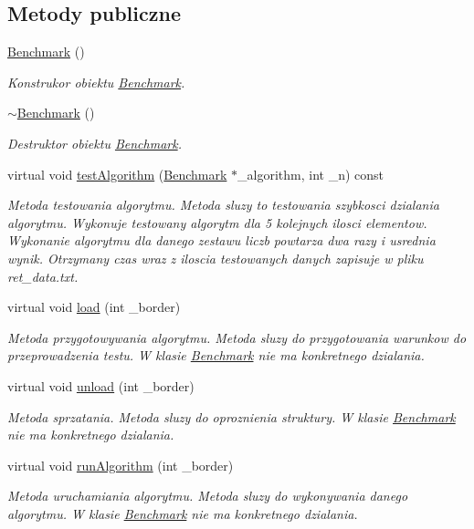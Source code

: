 \subsection*{Metody publiczne}
\begin{DoxyCompactItemize}
\item 
\hyperlink{class_benchmark_acfca497989836a688d44477802e822d8}{Benchmark} ()
\begin{DoxyCompactList}\small\item\em Konstrukor obiektu \hyperlink{class_benchmark}{Benchmark}. \end{DoxyCompactList}\item 
\hyperlink{class_benchmark_a20476e07f09e2b20ed3e9a7f13a570e6}{$\sim$\-Benchmark} ()
\begin{DoxyCompactList}\small\item\em Destruktor obiektu \hyperlink{class_benchmark}{Benchmark}. \end{DoxyCompactList}\item 
virtual void \hyperlink{class_benchmark_a900bc0d26c2ed6aa45afe4d5b295ccd1}{test\-Algorithm} (\hyperlink{class_benchmark}{Benchmark} $\ast$\-\_\-algorithm, int \-\_\-n) const 
\begin{DoxyCompactList}\small\item\em Metoda testowania algorytmu. Metoda sluzy to testowania szybkosci dzialania algorytmu. Wykonuje testowany algorytm dla 5 kolejnych ilosci elementow. Wykonanie algorytmu dla danego zestawu liczb powtarza dwa razy i usrednia wynik. Otrzymany czas wraz z iloscia testowanych danych zapisuje w pliku ret\-\_\-data.\-txt. \end{DoxyCompactList}\item 
virtual void \hyperlink{class_benchmark_a935c57201a5d0b9589a898df38b8b5a3}{load} (int \-\_\-border)
\begin{DoxyCompactList}\small\item\em Metoda przygotowywania algorytmu. Metoda sluzy do przygotowania warunkow do przeprowadzenia testu. W klasie \hyperlink{class_benchmark}{Benchmark} nie ma konkretnego dzialania. \end{DoxyCompactList}\item 
virtual void \hyperlink{class_benchmark_aafd856205ecb699568533fff0be01209}{unload} (int \-\_\-border)
\begin{DoxyCompactList}\small\item\em Metoda sprzatania. Metoda sluzy do oproznienia struktury. W klasie \hyperlink{class_benchmark}{Benchmark} nie ma konkretnego dzialania. \end{DoxyCompactList}\item 
virtual void \hyperlink{class_benchmark_a6363894c058e8bfe146de09d7126b29c}{run\-Algorithm} (int \-\_\-border)
\begin{DoxyCompactList}\small\item\em Metoda uruchamiania algorytmu. Metoda sluzy do wykonywania danego algorytmu. W klasie \hyperlink{class_benchmark}{Benchmark} nie ma konkretnego dzialania. \end{DoxyCompactList}\end{DoxyCompactItemize}
